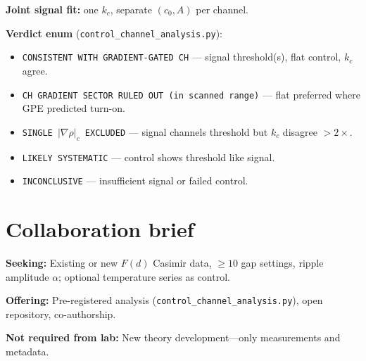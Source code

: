 \documentclass[11pt,a4paper]{article}
\newcommand{\py}[1]{\nolinkurl{#1}}
\begin{document}
\textbf{Joint signal fit:} one $k_c$, separate $(c_0, A)$ per channel.

\textbf{Verdict enum} (\texttt{control\_channel\_analysis.py}):
\begin{itemize}[leftmargin=*]
  \item \texttt{CONSISTENT WITH GRADIENT-GATED CH} --- signal threshold(s), flat control, $k_c$ agree.
  \item \texttt{CH GRADIENT SECTOR RULED OUT (in scanned range)} --- flat preferred where GPE predicted turn-on.
  \item \texttt{SINGLE $|\nabla\rho|_c$ EXCLUDED} --- signal channels threshold but $k_c$ disagree $>2\times$.
  \item \texttt{LIKELY SYSTEMATIC} --- control shows threshold like signal.
  \item \texttt{INCONCLUSIVE} --- insufficient signal or failed control.
\end{itemize}

\section{Collaboration brief}
\label{app:collab}

\textbf{Seeking:} Existing or new $F(d)$ Casimir data, $\geq 10$ gap settings, ripple amplitude $\alpha$; optional temperature series as control.

\textbf{Offering:} Pre-registered analysis (\py{control_channel_analysis.py}), open repository, co-authorship.

\textbf{Not required from lab:} New theory development---only measurements and metadata.
\end{document}
